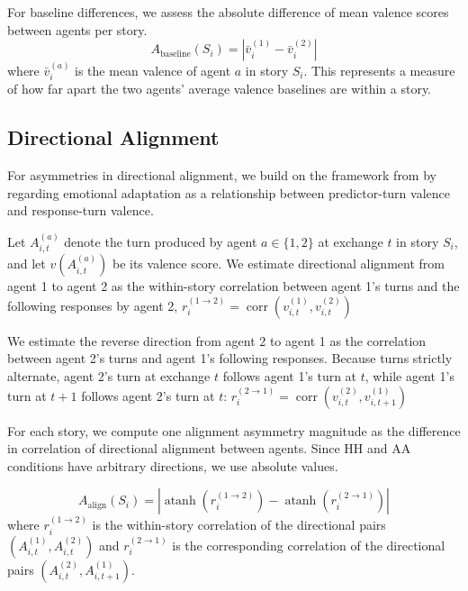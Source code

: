 \documentclass[11pt]{article}
\begin{document}
For baseline differences, we assess the absolute difference of mean valence scores between agents per story. 
\begin{equation}
    A_{\mathrm{baseline}}(S_i)
    =
    \left|
    \bar{v}^{(1)}_i
    -
    \bar{v}^{(2)}_i
    \right|
\end{equation}
where $\bar{v}^{(a)}_i$ is the mean valence of agent $a$ in story $S_i$. This represents a measure of how far apart the two agents’ average valence baselines are within a story.

\subsection{Directional Alignment}
For asymmetries in directional alignment, we build on the framework from \cite{fundal2026directionalalignmentnarrativeagency} by regarding emotional adaptation as a relationship between predictor-turn valence and response-turn valence. 

Let \(A^{(a)}_{i,t}\) denote the turn produced by agent \(a \in \{1,2\}\) at exchange \(t\) in story \(S_i\), and let \(v(A^{(a)}_{i,t})\) be its valence score. We estimate directional alignment from agent 1 to agent 2 as the within-story correlation between agent 1's turns and the following responses by agent 2, $r_i^{(1 \to 2)} = \operatorname{corr}(v^{(1)}_{i,t}, v^{(2)}_{i,t})$

We estimate the reverse direction from agent 2 to agent 1 as the correlation between agent 2's turns and agent 1's following responses. Because turns strictly alternate, agent 2's turn at exchange $t$ follows agent 1's turn at $t$, while agent 1's turn at $t+1$ follows agent 2's turn at $t$:
$r_i^{(2 \to 1)} = \operatorname{corr}(v^{(2)}_{i,t}, v^{(1)}_{i,t+1})$

For each story, we compute one alignment asymmetry magnitude as the difference in correlation of directional alignment between agents. Since HH and AA conditions have arbitrary directions, we use absolute values.

\begin{equation}
    A_{\mathrm{align}}(S_i)
    =
    \left|
    \operatorname{atanh}\!\left(r_i^{(1 \rightarrow 2)}\right)
    -
    \operatorname{atanh}\!\left(r_i^{(2 \rightarrow 1)}\right)
    \right|
\end{equation}
where $r_i^{(1 \rightarrow 2)}$ is the within-story correlation of the directional pairs $(A^{(1)}_{i,t}, A^{(2)}_{i,t})$ and $r_i^{(2 \rightarrow 1)}$ is the corresponding correlation of the directional pairs $(A^{(2)}_{i,t}, A^{(1)}_{i,t+1})$.
\end{document}
